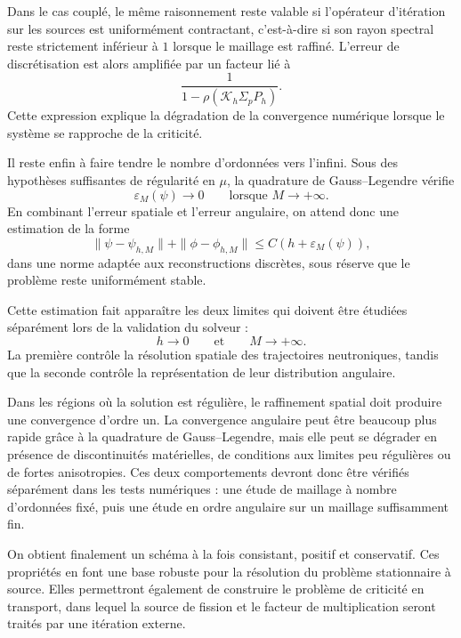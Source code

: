 \documentclass{article}
\begin{document}
Dans le cas couplé, le même raisonnement reste valable si l'opérateur d'itération sur les sources est uniformément contractant, c'est-à-dire si son rayon spectral reste strictement inférieur à $1$ lorsque le maillage est raffiné. L'erreur de discrétisation est alors amplifiée par un facteur lié à
\[
    \frac{1}{
        1-\rho(\mathcal K_h\Sigma_pP_h)
    }.
\]
Cette expression explique la dégradation de la convergence numérique lorsque le système se rapproche de la criticité.

Il reste enfin à faire tendre le nombre d'ordonnées vers l'infini. Sous des hypothèses suffisantes de régularité en $\mu$, la quadrature de Gauss--Legendre vérifie
\[
    \varepsilon_M(\psi)\longrightarrow0
    \qquad\text{lorsque }M\longrightarrow+\infty.
\]
En combinant l'erreur spatiale et l'erreur angulaire, on attend donc une
estimation de la forme
\begin{equation}
    \boxed{
        \|\psi-\psi_{h,M}\| + \|\phi-\phi_{h,M}\|
        \leq C \left(h+\varepsilon_M(\psi) \right),}
    \label{eq:convergence-globale-transport}
\end{equation}
dans une norme adaptée aux reconstructions discrètes, sous réserve que le problème reste uniformément stable.

Cette estimation fait apparaître les deux limites qui doivent être étudiées séparément lors de la validation du solveur :
\[
    h\longrightarrow0
    \qquad\text{et}\qquad
    M\longrightarrow+\infty.
\]
La première contrôle la résolution spatiale des trajectoires neutroniques, tandis que la seconde contrôle la représentation de leur distribution angulaire.

Dans les régions où la solution est régulière, le raffinement spatial doit produire une convergence d'ordre un. La convergence angulaire peut être beaucoup plus rapide grâce à la quadrature de Gauss--Legendre, mais elle peut se dégrader en présence de discontinuités matérielles, de conditions aux limites peu régulières ou de fortes anisotropies. Ces deux comportements devront donc être vérifiés séparément dans les tests numériques : une étude de maillage à nombre d'ordonnées fixé, puis une étude en ordre angulaire sur un maillage suffisamment fin.

On obtient finalement un schéma à la fois consistant, positif et conservatif. Ces propriétés en font une base robuste pour la résolution du problème stationnaire à source. Elles permettront également de construire le problème de criticité en transport, dans lequel la source de fission et le facteur de multiplication seront traités par une itération externe.
\end{document}
